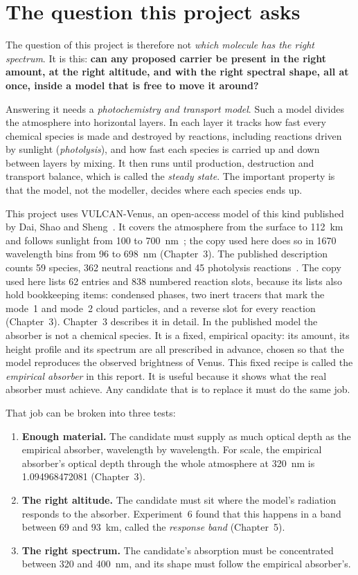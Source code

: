 \section{The question this project asks}
\label{sec:question}

The question of this project is therefore not \emph{which molecule has the right
spectrum}. It is this: \textbf{can any proposed carrier be present in the right amount, at
the right altitude, and with the right spectral shape, all at once, inside a model that
is free to move it around?}

Answering it needs a \emph{photochemistry and transport model}. Such a model divides the
atmosphere into horizontal layers. In each layer it tracks how fast every chemical
species is made and destroyed by reactions, including reactions driven by sunlight
(\emph{photolysis}), and how fast each species is carried up and down between layers by
mixing. It then runs until production, destruction and transport balance, which is called
the \emph{steady state}. The important property is that the model, not the modeller,
decides where each species ends up.

This project uses VULCAN-Venus, an open-access model of this kind published by Dai, Shao
and Sheng~\cite{dai2024}. It covers the atmosphere from the surface to 112~km and follows
sunlight from 100 to 700~nm~\cite{dai2024}; the copy used here does so in 1670
wavelength bins from 96 to 698~nm (Chapter~3). The published description counts
59 species, 362 neutral reactions and 45 photolysis reactions~\cite{dai2024}. The copy
used here lists 62 entries and 838 numbered reaction slots, because its lists also hold
bookkeeping items: condensed phases, two inert tracers that mark the mode~1 and mode~2
cloud particles, and a reverse slot for every reaction (Chapter~3).
Chapter~3 describes it in detail. In the published model the absorber is not a chemical
species. It is a fixed, empirical opacity: its amount, its height profile and its spectrum
are all prescribed in advance, chosen so that the model reproduces the observed
brightness of Venus. This fixed recipe is called the \emph{empirical absorber} in this
report. It is useful because it shows what the real absorber must achieve. Any candidate
that is to replace it must do the same job.

That job can be broken into three tests:
\begin{enumerate}
  \item \textbf{Enough material.} The candidate must supply as much optical depth as the
    empirical absorber, wavelength by wavelength. For scale, the empirical absorber's
    optical depth through the whole atmosphere at
    320~nm is 1.094968472081 (Chapter~3).
  \item \textbf{The right altitude.} The candidate must sit where the model's radiation
    responds to the absorber. Experiment~6 found that this happens in a band between 69
    and 93~km, called the \emph{response band} (Chapter~5).
  \item \textbf{The right spectrum.} The candidate's absorption must be concentrated
    between 320 and 400~nm, and its shape must follow the empirical absorber's.
\end{enumerate}

